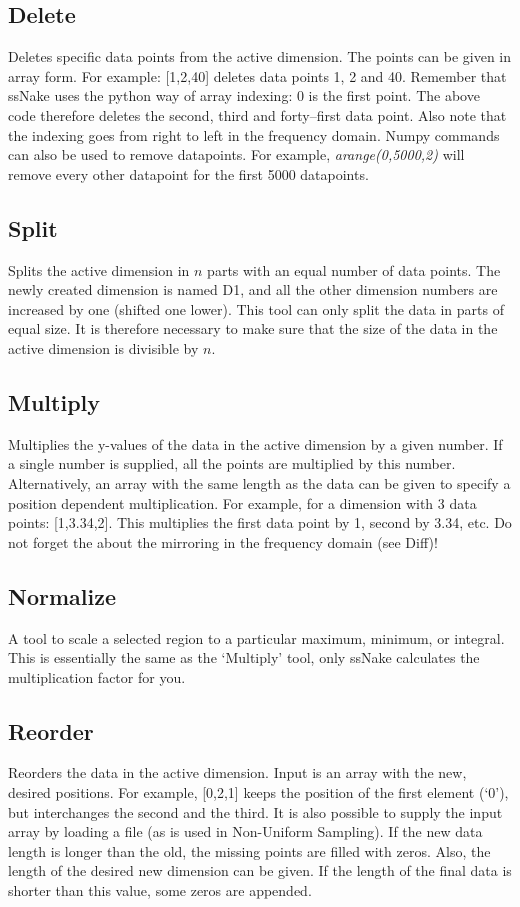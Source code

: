 \documentclass[11pt,a4paper]{article}
\begin{document}
\subsection{Delete}
Deletes specific data points from the active dimension.
The points can be given in array form.
For example: [1,2,40] deletes data points 1, 2 and 40.
Remember that ssNake uses the python way of array indexing: 0 is the first point.
The above code therefore deletes the second, third and forty--first data point.
Also note that the indexing goes from right to left in the frequency domain.
Numpy commands can also be used to remove datapoints.
For example, \textit{arange(0,5000,2)} will remove every other datapoint for the first 5000 datapoints.

\subsection{Split}
Splits the active dimension in $n$ parts with an equal number of data points.
The newly created dimension is named D1, and all the other dimension numbers are increased by one (shifted one lower).
This tool can only split the data in parts of equal size.
It is therefore necessary to make sure that the size of the data in the active dimension is divisible by $n$.

\subsection{Multiply}
Multiplies the y-values of the data in the active dimension by a given number.
If a single number is supplied, all the points are multiplied by this number.
Alternatively, an array with the same length as the data can be given to specify a position dependent multiplication.
For example, for a dimension with 3 data points: [1,3.34,2].
This multiplies the first data point by 1, second by 3.34, etc.
Do not forget the about the mirroring in the frequency domain (see Diff)!

\subsection{Normalize}
A tool to scale a selected region to a particular maximum, minimum, or integral.
This is essentially the same as the `Multiply' tool, only ssNake calculates the multiplication factor for you.

\subsection{Reorder}
Reorders the data in the active dimension.
Input is an array with the new, desired positions.
For example, [0,2,1] keeps the position of the first element (`0'), but interchanges the second and the third.
It is also possible to supply the input array by loading a file (as is used in Non-Uniform Sampling).
If the new data length is longer than the old, the missing points are filled with zeros.
Also, the length of the desired new dimension can be given.
If the length of the final data is shorter than this value, some zeros are appended.
\end{document}
